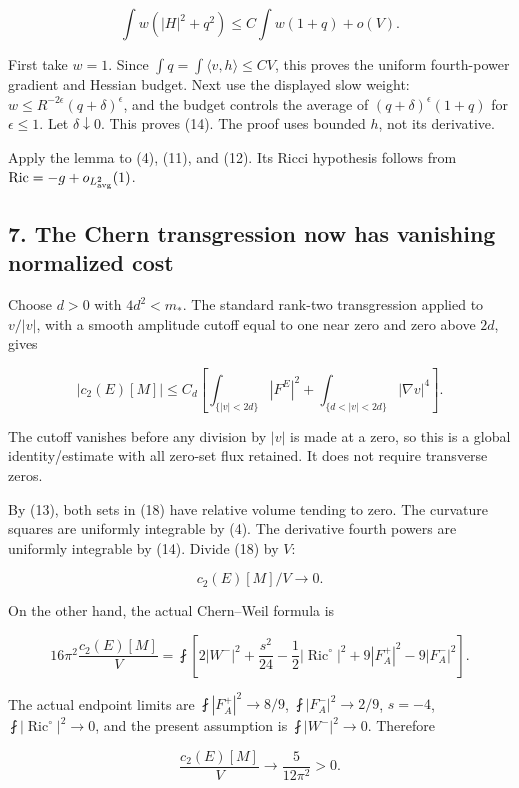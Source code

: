 \[
 \int w(|H|^2+q^2)\le C\int w(1+q)+o(V).
\tag{17}
\]

First take \(w=1\). Since \(\int q=\int\langle v,h\rangle\le CV\), this
proves the uniform fourth-power gradient and Hessian budget. Next use
the displayed slow weight: \(w\le R^{-2\epsilon}(q+\delta)^\epsilon\),
and the budget controls the average of \((q+\delta)^\epsilon(1+q)\) for
\(\epsilon\le1\). Let \(\delta\downarrow0\). This proves (14). The proof
uses bounded \(h\), not its derivative.

Apply the lemma to (4), (11), and (12). Its Ricci hypothesis follows
from \(\operatorname{Ric}=-g+o_{L^2_{\rm avg}}(1)\).

\hypertarget{o10critical:the-chern-transgression-now-has-vanishing-normalized-cost}{%
\subsection{7. The Chern transgression now has vanishing normalized
cost}\label{o10critical:the-chern-transgression-now-has-vanishing-normalized-cost}}

Choose \(d>0\) with \(4d^2<m_*\). The standard rank-two transgression
applied to \(v/|v|\), with a smooth amplitude cutoff equal to one near
zero and zero above \(2d\), gives

\[
 |c_2(E)[M]|
 \le C_d\left[
 \int_{\{|v|<2d\}}|F^E|^2+
 \int_{\{d<|v|<2d\}}|\nabla v|^4\right].
\tag{18}
\]

The cutoff vanishes before any division by \(|v|\) is made at a zero, so
this is a global identity/estimate with all zero-set flux retained. It
does not require transverse zeros.

By (13), both sets in (18) have relative volume tending to zero. The
curvature squares are uniformly integrable by (4). The derivative fourth
powers are uniformly integrable by (14). Divide (18) by \(V\):

\[
 \boxed{c_2(E)[M]/V\longrightarrow0.}\tag{19}
\]

On the other hand, the actual Chern--Weil formula is

\[
 16\pi^2\frac{c_2(E)[M]}V
 =\fint\left[
 2|W^-|^2+\frac{s^2}{24}
 -\frac12|\operatorname{Ric}^{\circ}|^2
 +9|F_A^+|^2-9|F_A^-|^2\right].
\]

The actual endpoint limits are \(\fint|F_A^+|^2\to8/9\),
\(\fint|F_A^-|^2\to2/9\), \(s=-4\),
\(\fint|\operatorname{Ric}^{\circ}|^2\to0\), and the present assumption
is \(\fint|W^-|^2\to0\). Therefore

\[
 \boxed{\frac{c_2(E)[M]}V\longrightarrow
                   \frac{5}{12\pi^2}>0.}\tag{20}
\]

